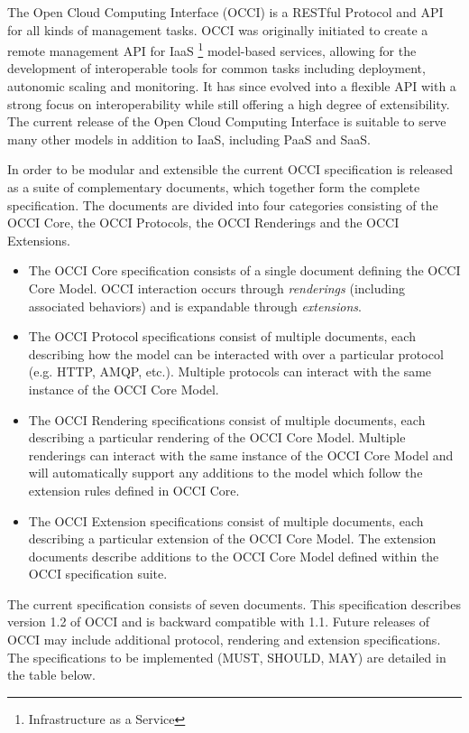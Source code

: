 The Open Cloud Computing Interface (OCCI) is a RESTful Protocol and
API for all kinds of management tasks. OCCI was originally initiated
to create a remote management API for IaaS%
\footnote{Infrastructure as a Service}
model-based services, allowing for the development of interoperable tools for
common tasks including deployment, autonomic scaling and monitoring.
%
It has since evolved into a flexible API with a strong focus on
interoperability while still offering a high degree of extensibility. The
current release of the Open Cloud Computing Interface is suitable to serve many
other models in addition to IaaS, including PaaS and SaaS.

In order to be modular and extensible the current OCCI specification is
released as a suite of complementary documents, which together form the complete
specification.
%
The documents are divided into four categories consisting of the OCCI Core,
the OCCI Protocols, the OCCI Renderings and the OCCI Extensions.
%
\begin{itemize}
\item The OCCI Core specification consists of a single document defining the OCCI 
 Core Model.  OCCI interaction occurs through \emph{renderings} (including 
 associated behaviors) and is expandable through \emph{extensions}.
\item The OCCI Protocol specifications consist of multiple documents, each
 describing how the model can be interacted with over a particular protocol (e.g. HTTP, AMQP, etc.).
 Multiple protocols can interact with the same instance of the OCCI Core Model.
\item The OCCI Rendering specifications consist of multiple documents, each
 describing a particular rendering of the OCCI Core Model. Multiple renderings can
 interact with the same instance of the OCCI Core Model and will automatically support
 any additions to the model which follow the extension rules defined in OCCI
 Core.
\item The OCCI Extension specifications consist of multiple documents,
  each describing a particular extension of the OCCI Core Model. The
  extension documents describe additions to the OCCI Core Model
  defined within the OCCI specification suite.
\end{itemize}
%

The current specification consists of seven documents. This
specification describes version 1.2 of OCCI and is backward compatible with 1.1.
Future releases of OCCI
may include additional protocol, rendering and extension specifications. The specifications to be
implemented (MUST, SHOULD, MAY) are detailed in the table below.

